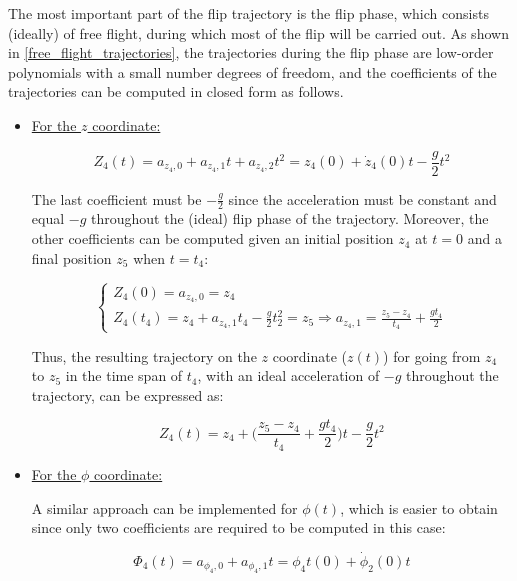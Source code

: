 \documentclass{thesisreport}
\begin{document}
The most important part of the flip trajectory is the flip phase, which consists (ideally) of free flight, during which most of the flip will be carried out. As shown in \ref{free_flight_trajectories}, the trajectories during the flip phase are low-order polynomials with a small number degrees of freedom, and the coefficients of the trajectories can be computed in closed form as follows. 

\begin{itemize}
	\item \underline{For the $z$ coordinate:}
	
	\begin{equation}
		Z_4(t) = a_{z_4,0} + a_{z_4,1}t + a_{z_4,2}t^2 = z_4(0) + \dot{z}_4(0)t - \frac{g}{2}t^2
	\end{equation}
	
The last coefficient must be $-\frac{g}{2}$ since the acceleration must be constant and equal $-g$ throughout the (ideal) flip phase of the trajectory. Moreover, the other coefficients can be computed given an initial position $z_4$ at $t=0$ and a final position $z_5$ when $t=t_4$:

\begin{equation}
	\begin{cases}
		Z_4(0) = a_{z_4,0}=z_4 \\
		Z_4(t_4) = z_4 + a_{z_4,1}t_4 - \frac{g}{2}t_2^2 = z_5 \Rightarrow a_{z_4,1} = \frac{z_5 - z_4}{t_4} + \frac{g t_4}{2}
	\end{cases}
\end{equation}
	
	Thus, the resulting trajectory on the $z$ coordinate ($z(t)$) for going from $z_4$ to $z_5$ in the time span of $t_4$, with an ideal acceleration of $-g$ throughout the trajectory, can be expressed as:
	
\begin{equation}
	Z_4(t) = z_4 + \bigg( \frac{z_5 - z_4}{t_4} + \frac{g t_4}{2} \bigg)t - \frac{g}{2} t^2
\end{equation}

\newpage

	\item \underline{For the $\phi$ coordinate:}

A similar approach can be implemented for $\phi(t)$, which is easier to obtain since only two coefficients are required to be computed in this case:

\begin{equation}\label{phi_4_general_form}
	\Phi_4 (t) = a_{\phi_4,0} + a_{\phi_4,1}t = \phi_4 t (0) + \dot{\phi}_2 (0)t
\end{equation}



\end{itemize}
\end{document}
